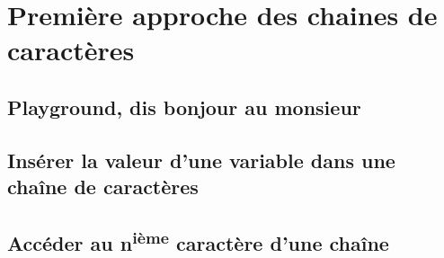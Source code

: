 \chapter{Première approche des chaines de caractères}

\section{Playground, dis bonjour au monsieur}

\section{Insérer la valeur d'une variable dans une chaîne de caractères}

\section{Accéder au n\textsuperscript{ième} caractère d'une chaîne}
